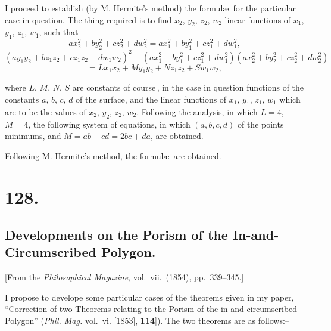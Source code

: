 \documentclass[11pt,a4paper]{book}
\begin{document}
\medskip

I proceed to establish (by M. Hermite's method) the formul\ae\ for the particular
case in question. The thing required is to find $x_2$, $y_2$, $z_2$, $w_2$ linear functions of
$x_1$, $y_1$, $z_1$, $w_1$, such that
\[
ax_2^2 + by_2^2 + cz_2^2 + dw_2^2 = ax_1^2 + by_1^2 + cz_1^2 + dw_1^2,
\]
\[
(ay_1y_2 + bz_1z_2 + cz_1z_2 + dw_1w_2)^2 - (ax_1^2 + by_1^2 + cz_1^2 + dw_1^2)(ax_2^2+by_2^2+cz_2^2+dw_2^2)
\]
\[
= L x_1 x_2 + M y_1 y_2 + N z_1 z_2 + S w_1 w_2,
\]

\noindent where $L$, $M$, $N$, $S$ are constants of course\,, in the case in question functions of
the constants $a$, $b$, $c$, $d$ of the surface, and the linear functions of $x_1$, $y_1$, $z_1$, $w_1$ which
are to be the values of $x_2$, $y_2$, $z_2$, $w_2$. Following the analysis, in which $L=4$, $M=4$,
the following system of equations, in which $(a, b, c, d)$ of the points minimums, and $M=ab+cd=2bc+da$, are obtained.

\medskip

Following M. Hermite's method, the formul\ae\ are obtained.

\section*{128.}
\subsection*{Developments on the Porism of the In-and-Circumscribed Polygon.}

[From the \textit{Philosophical Magazine}, vol.\ vii.\ (1854), pp.\ 339--345.]

\medskip

I propose to develope some particular cases of the theorems given in my paper,
``Correction of two Theorems relating to the Porism of the in-and-circumscribed
Polygon'' (\textit{Phil. Mag.} vol.\ vi. [1853], \textbf{114}]). The two theorems are as follows:--

\medskip
\end{document}
